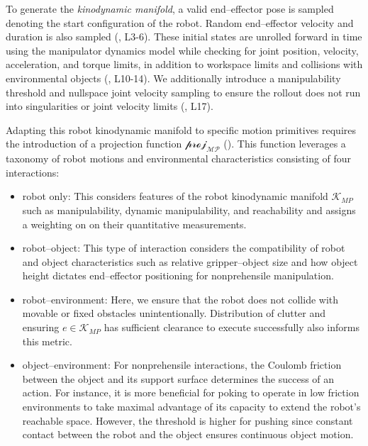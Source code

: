 To generate the \textsl{kinodynamic manifold}, a valid end--effector pose is sampled denoting the start configuration of the robot. Random end--effector velocity and duration is also sampled (, L3-6). These initial states are unrolled forward in time using the manipulator dynamics model while checking for joint position, velocity, acceleration, and torque limits, in addition to workspace limits and collisions with environmental objects (, L10-14). We additionally introduce a manipulability threshold and nullspace joint velocity sampling to ensure the rollout does not run into singularities or joint velocity limits (, L17).

% 

Adapting this robot kinodynamic manifold to specific motion primitives requires the introduction of a projection function $\mathcal{proj_{MP}}$ (). This function leverages a taxonomy of robot motions and environmental characteristics consisting of four interactions:
\begin{itemize}
\item robot only: This considers features of the robot kinodynamic manifold $\mathcal{K}_{MP}$ such as manipulability, dynamic manipulability, and reachability and assigns a weighting on on their quantitative measurements.
\item robot--object: This type of interaction considers the compatibility of robot and object characteristics such as relative gripper--object size and how object height dictates end--effector positioning for nonprehensile manipulation.
\item robot--environment: Here, we ensure that the robot does not collide with movable or fixed obstacles unintentionally. Distribution of clutter and ensuring $e \in \mathcal{K}_{MP}$ has sufficient clearance to execute successfully also informs this metric.
\item object--environment: For nonprehensile interactions, the Coulomb friction between the object and its support surface determines the success of an action. For instance, it is more beneficial for poking to operate in low friction environments to take maximal advantage of its capacity to extend the robot's reachable space. However, the threshold is higher for pushing since constant contact between the robot and the object ensures continuous object motion.
\end{itemize}

